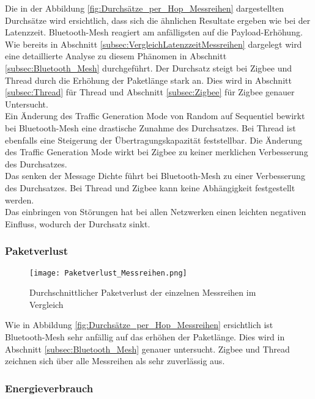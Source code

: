 Die in der Abbildung \ref{fig:Durchsätze_per_Hop_Messreihen} dargestellten Durchsätze wird ersichtlich, dass sich die ähnlichen Resultate ergeben wie bei der Latenzzeit. Bluetooth-Mesh reagiert am anfälligsten auf die Payload-Erhöhung. Wie bereits in Abschnitt \ref{subsec:VergleichLatenzzeitMessreihen} dargelegt wird eine detaillierte Analyse zu diesem Phänomen in Abschnitt \ref{subsec:Bluetooth_Mesh} durchgeführt. Der Durchsatz steigt bei Zigbee und Thread durch die Erhöhung der Paketlänge stark an. Dies wird in Abschnitt \ref{subsec:Thread} für Thread und Abschnitt \ref{subsec:Zigbee} für Zigbee genauer Untersucht. \\

Ein Änderung des Traffic Generation Mode von Random auf Sequentiel bewirkt bei Bluetooth-Mesh eine drastische Zunahme des Durchsatzes. Bei Thread ist ebenfalls eine Steigerung der Übertragungskapazität feststellbar. Die Änderung des Traffic Generation Mode wirkt bei Zigbee zu keiner merklichen Verbesserung des Durchsatzes.\\

Das senken der Message Dichte führt bei Bluetooth-Mesh zu einer Verbesserung des Durchsatzes. Bei Thread und Zigbee kann keine Abhängigkeit festgestellt werden. \\

Das einbringen von Störungen hat bei allen Netzwerken einen leichten negativen Einfluss, wodurch der Durchsatz sinkt. 

\subsubsection{Paketverlust}\label{subsec:VergleichPaketverlustMessreihen}


\begin{figure}
	\centering
	\texttt{[image: Paketverlust\_Messreihen.png]}
	\caption{Durchschnittlicher Paketverlust der einzelnen Messreihen im Vergleich}\label{fig:PaketverlusteMessreihen}
\end{figure}

Wie in Abbildung \ref{fig:Durchsätze_per_Hop_Messreihen} ersichtlich ist Bluetooth-Mesh sehr anfällig auf das erhöhen der Paketlänge. Dies wird in Abschnitt \ref{subsec:Bluetooth_Mesh} genauer untersucht. Zigbee und Thread zeichnen sich über alle Messreihen als sehr zuverlässig aus. 


\subsubsection{Energieverbrauch}\label{subsec:VergleichEnergieverbrauchMessreihen}


